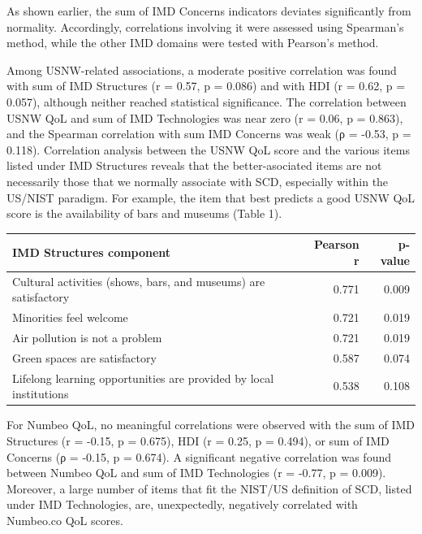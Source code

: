 \documentclass[
  english,
  12pt,
  a4paper,
]{scrartcl}
\begin{document}
As shown earlier, the sum of IMD Concerns indicators deviates
significantly from normality. Accordingly, correlations involving it
were assessed using Spearman's method, while the other IMD domains were
tested with Pearson's method.

Among USNW-related associations, a moderate positive correlation was
found with sum of IMD Structures (r = 0.57, p = 0.086) and with HDI (r =
0.62, p = 0.057), although neither reached statistical significance. The
correlation between USNW QoL and sum of IMD Technologies was near zero
(r = 0.06, p = 0.863), and the Spearman correlation with sum IMD
Concerns was weak (ρ = -0.53, p = 0.118). Correlation analysis between
the USNW QoL score and the various items listed under IMD Structures
reveals that the better-asociated items are not necessarily those that
we normally associate with SCD, especially within the US/NIST paradigm.
For example, the item that best predicts a good USNW QoL score is the
availability of bars and museums (Table 1).

\begin{longtable}[]{@{}lrr@{}}
\toprule\noalign{}
IMD Structures component & Pearson r & p-value \\
\midrule\noalign{}
\endhead
\bottomrule\noalign{}
\endlastfoot
Cultural activities (shows, bars, and museums) are satisfactory & 0.771
& 0.009 \\
Minorities feel welcome & 0.721 & 0.019 \\
Air pollution is not a problem & 0.721 & 0.019 \\
Green spaces are satisfactory & 0.587 & 0.074 \\
Lifelong learning opportunities are provided by local institutions &
0.538 & 0.108 \\
\end{longtable}

For Numbeo QoL, no meaningful correlations were observed with the sum of
IMD Structures (r = -0.15, p = 0.675), HDI (r = 0.25, p = 0.494), or sum
of IMD Concerns (ρ = -0.15, p = 0.674). A significant negative
correlation was found between Numbeo QoL and sum of IMD Technologies (r
= -0.77, p = 0.009). Moreover, a large number of items that fit the
NIST/US definition of SCD, listed under IMD Technologies, are,
unexpectedly, negatively correlated with Numbeo.co QoL scores.
\end{document}
